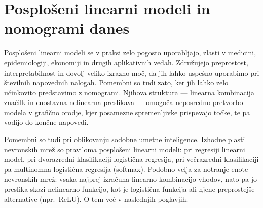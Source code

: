 






\section{Posplošeni linearni modeli in nomogrami danes}

Posplošeni linearni modeli se v praksi zelo pogosto uporabljajo, zlasti v medicini, epidemiologiji, ekonomiji in drugih aplikativnih vedah. Združujejo preprostost, interpretabilnost in dovolj veliko izrazno moč, da jih lahko uspešno uporabimo pri številnih napovednih nalogah. Pomembni so tudi zato, ker jih lahko zelo učinkovito predstavimo z nomogrami. Njihova struktura — linearna kombinacija značilk in enostavna nelinearna preslikava — omogoča neposredno pretvorbo modela v grafično orodje, kjer posamezne spremenljivke prispevajo točke, te pa vodijo do končne napovedi.

Pomembni so tudi pri oblikovanju sodobne umetne inteligence. Izhodne plasti nevronskih mrež so praviloma posplošeni linearni modeli: pri regresiji linearni model, pri dvorazredni klasifikaciji logistična regresija, pri večrazredni klasifikaciji pa multinomna logistična regresija (softmax). Podobno velja za notranje enote nevronskih mrež: vsaka najprej izračuna linearno kombinacijo vhodov, nato pa jo preslika skozi nelinearno funkcijo, kot je logistična funkcija ali njene preprostejše alternative (npr.\ ReLU). O tem več v naslednjih poglavjih.